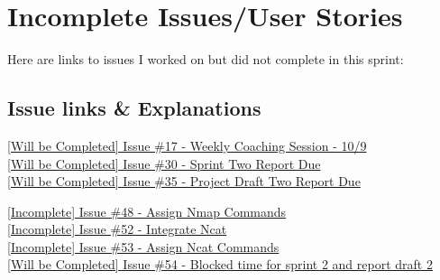 \documentclass{article}
\begin{document}
\newpage

\section{Incomplete Issues/User Stories}
Here are links to issues I worked on but did not complete in this sprint:
\subsection{Issue links \& Explanations}
\href{https://github.com/zachA214/Adelson_Senior_Capstone/issues/17}{[Will be Completed] Issue \#17 - Weekly Coaching Session - 10/9} \\
\noindent{}
\href{https://github.com/zachA214/Adelson_Senior_Capstone/issues/30}{[Will be Completed] Issue \#30 - Sprint Two Report Due} \\
\noindent{}
\href{https://github.com/zachA214/Adelson_Senior_Capstone/issues/35}{[Will be Completed] Issue \#35 - Project Draft Two Report Due} \\
\noindent{}

\href{https://github.com/zachA214/Adelson_Senior_Capstone/issues/48}{[Incomplete] Issue \#48 - Assign Nmap Commands} \\
\noindent{}
\href{https://github.com/zachA214/Adelson_Senior_Capstone/issues/52}{[Incomplete] Issue \#52 - Integrate Ncat} \\
\noindent{}
\href{https://github.com/zachA214/Adelson_Senior_Capstone/issues/53}{[Incomplete] Issue \#53 - Assign Ncat Commands} \\
\noindent{}
\href{https://github.com/zachA214/Adelson_Senior_Capstone/issues/54}{[Will be Completed] Issue \#54 - Blocked time for sprint 2 and report draft 2} \\
\noindent{}
\newpage
\end{document}
